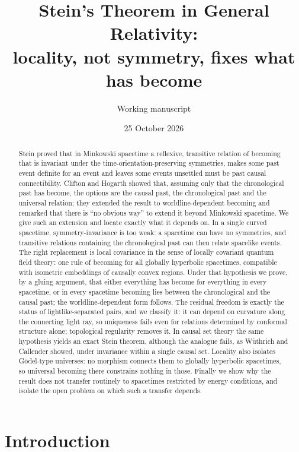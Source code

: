 \documentclass[11pt]{article}
\title{Stein's Theorem in General Relativity:\\[2pt]
\large locality, not symmetry, fixes what has become}
\author{Working manuscript}
\date{25 October 2026}
\theoremstyle{definition}
\begin{document}
\maketitle

\begin{abstract}
Stein proved that in Minkowski spacetime a reflexive, transitive relation of
becoming that is invariant under the time-orientation-preserving symmetries,
makes some past event definite for an event and leaves some events unsettled
must be past causal connectibility. Clifton
and Hogarth showed that, assuming only that the chronological past has become,
the options are the causal past, the chronological past and the universal
relation; they extended the result to worldline-dependent becoming and
remarked that there is ``no
obvious way'' to extend it beyond Minkowski spacetime. We give such an
extension and locate exactly what it depends on. In a single curved
spacetime, symmetry-invariance is too weak: a spacetime can have no
symmetries, and transitive relations containing the chronological past can
then relate spacelike events. The right replacement is local covariance in
the sense of locally covariant quantum field theory: one rule of becoming for
all globally hyperbolic spacetimes, compatible with isometric embeddings of
causally convex regions. Under that hypothesis we prove, by a gluing
argument, that either everything has become for everything in every
spacetime, or in every spacetime becoming lies between the chronological and
the causal past; the worldline-dependent form follows. The residual freedom is exactly the status of
lightlike-separated pairs, and we classify it: it can depend on curvature
along the connecting light ray, so uniqueness fails even for relations
determined by conformal structure alone; topological regularity removes it. In
causal set theory the same hypothesis yields an exact Stein theorem,
although the analogue fails, as Wüthrich and Callender showed, under
invariance within a single causal set. Locality also isolates
Gödel-type universes: no morphism connects them to globally hyperbolic
spacetimes, so universal becoming there constrains nothing in those. Finally we show why the result does not transfer routinely to
spacetimes restricted by energy conditions, and isolate the open problem on
which such a transfer depends.
\end{abstract}

\section{Introduction}\label{sec:intro}
\end{document}
